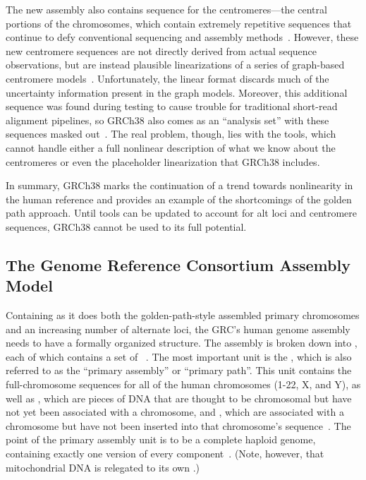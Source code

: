 The new assembly also contains sequence for the centromeres---the central portions of the chromosomes, which contain extremely repetitive sequences that continue to defy conventional sequencing and assembly methods~\cite{karolchik2014new}. However, these new centromere sequences are not directly derived from actual sequence observations, but are instead plausible linearizations of a series of graph-based centromere models~\cite{miga2014centromere}. Unfortunately, the linear format discards much of the uncertainty information present in the graph models. Moreover, this additional sequence was found during testing to cause trouble for traditional short-read alignment pipelines, so GRCh38 also comes as an ``analysis set'' with these sequences masked out~\cite{karolchik2014new}. The real problem, though, lies with the tools, which cannot handle either a full nonlinear description of what we know about the centromeres or even the placeholder linearization that GRCh38 includes.

In summary, GRCh38 marks the continuation of a trend towards nonlinearity in the human reference and provides an example of the shortcomings of the golden path approach. Until tools can be updated to account for alt loci and centromere sequences, GRCh38 cannot be used to its full potential.

\subsection{The Genome Reference Consortium Assembly Model}

    
Containing as it does both the golden-path-style assembled primary chromosomes and an increasing number of alternate loci, the GRC's human genome assembly needs to have a formally organized structure. The assembly is broken down into , each of which contains a set of ~\cite{schneider2013genome}. The most important unit is the , which is also referred to as the ``primary assembly'' or ``primary path''. This unit contains the full-chromosome sequences for all of the human chromosomes (1-22, X, and Y), as well as , which are pieces of DNA that are thought to be chromosomal but have not yet been associated with a chromosome, and , which are associated with a chromosome but have not been inserted into that chromosome's sequence~\cite{schneider2013genome}. The point of the primary assembly unit is to be a complete haploid genome, containing exactly one version of every component~\cite{schneider2013genome}. (Note, however, that mitochondrial DNA is relegated to its own .)

